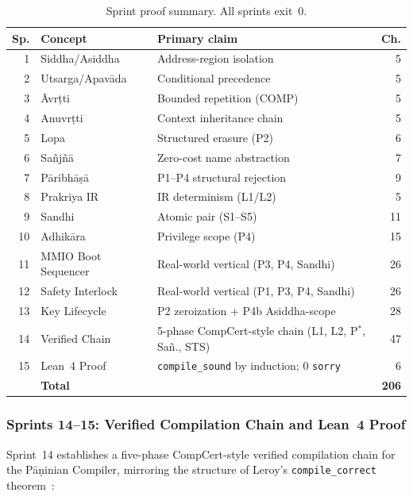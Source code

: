 \documentclass[11pt,a4paper]{article}
\begin{document}
\begin{table}[t]
\caption{Sprint proof summary. All sprints exit~0.}
\label{tab:sprints}
\small
\begin{tabularx}{\linewidth}{r p{3.0cm} X r}
\toprule
\textbf{Sp.} & \textbf{Concept} & \textbf{Primary claim} & \textbf{Ch.} \\
\midrule
1  & Siddha/Asiddha        & Address-region isolation & 5 \\
2  & Utsarga/Apav\={a}da   & Conditional precedence   & 5 \\
3  & \={A}vr\d{t}ti        & Bounded repetition (COMP)  & 5 \\
4  & Anuvr\d{t}ti          & Context inheritance chain & 5 \\
5  & Lopa                  & Structured erasure (P2)  & 6 \\
6  & Sa\~{n}j\~{n}\={a}    & Zero-cost name abstraction & 7 \\
7  & P\={a}ribh\={a}\d{s}\={a} & P1--P4 structural rejection & 9 \\
8  & Prakriya IR           & IR determinism (L1/L2)   & 5 \\
9  & Sandhi                & Atomic pair (S1--S5)     & 11 \\
10 & Adhi\-k\={a}ra        & Privilege scope (P4)     & 15 \\
11 & MMIO Boot Sequencer   & Real-world vertical (P3, P4, Sandhi) & 26 \\
12 & Safety Interlock      & Real-world vertical (P1, P3, P4, Sandhi) & 26 \\
13 & Key Lifecycle         & P2 zeroization + P4b Asiddha-scope & 28 \\
14 & Verified Chain        & 5-phase CompCert-style chain (L1, L2, P$^{*}$, Sa\~{n}., STS) & 47 \\
15 & Lean~4 Proof          & \texttt{compile\_{}sound} by induction; 0 \texttt{sorry}~\cite{moura2021lean4} & 6 \\
\midrule
   & \textbf{Total}        &                          & \textbf{206} \\
\bottomrule
\end{tabularx}
\end{table}

\subsubsection{Sprints 14--15: Verified Compilation Chain and Lean~4 Proof}

Sprint~14 establishes a five-phase CompCert-style verified compilation chain
for the Pāṇinian Compiler, mirroring the structure of Leroy's
\texttt{compile\_correct} theorem~\cite{leroy2009compcert}:
\end{document}
